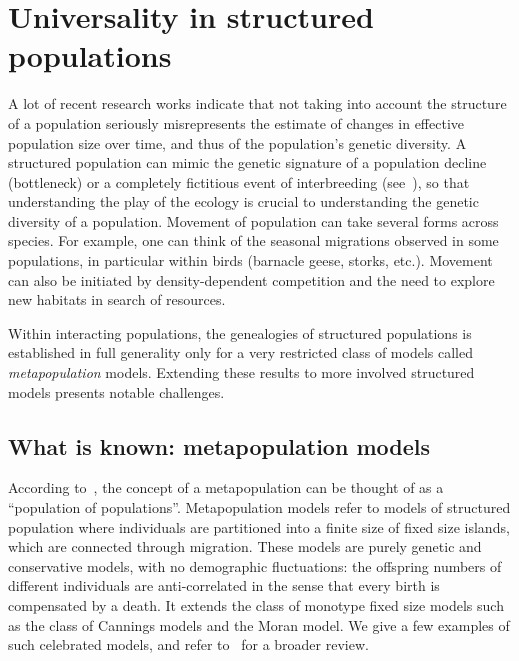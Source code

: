 \section{Universality in structured populations}
A lot of recent research works indicate that not taking into account the structure of a population seriously misrepresents the estimate of changes in effective population size over time, and thus of the population's genetic diversity. A structured population can mimic the genetic signature of a population decline (bottleneck) or a completely fictitious event of interbreeding (see~\citet{mazet_importance_2016}), so that understanding the play of the ecology is crucial to understanding the genetic diversity of a population. 
Movement of population can take several forms across species. For example, one can think of the seasonal migrations observed in some populations, in particular within birds (barnacle geese, storks, etc.). Movement can also be initiated by density-dependent competition and the need to explore new habitats in search of resources. 

Within interacting populations, the genealogies of structured populations is established in full generality only for a very restricted class of models called \emph{metapopulation} models. Extending these results to more involved structured models presents notable challenges.

\subsection{What is known: metapopulation models}
According to~\citet{levins1970extinction}, the concept of  a metapopulation can be thought of as a ``population of populations''.
Metapopulation models refer to models of structured population where individuals are partitioned into a finite size of fixed size islands, which are connected through migration. 
These models are purely genetic and conservative models, with no demographic fluctuations: the offspring numbers of different individuals are anti-correlated in the sense that every birth is compensated by a death. 
 It extends the class of monotype fixed size models such as the class of Cannings models and the Moran model. 
 We give a few examples of such celebrated models, and refer to~\citet{etheridge_mathematical_2011} for a broader review.
 
